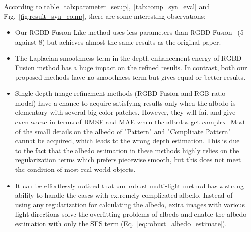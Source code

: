 According to table~\ref{tab:parameter_setup},~\ref{tab:comp_syn_eval} and Fig.~\ref{fig:result_syn_comp}, there are some interesting observations:
\begin{itemize}
    \item Our RGBD-Fusion Like method uses less parameters than RGBD-Fusion~\cite{or2015rgbd} (5 against 8) but achieves almost the same results as the original paper. 
    \item The Laplacian smoothness term in the depth enhancement energy of RGBD-Fusion method has a huge impact on the refined results. In contrast, both our proposed methods have no smoothness term but gives equal or better results.
    \item Single depth image refinement methods (RGBD-Fusion and RGB ratio model) have a chance to acquire satisfying results only when the albedo is elementary with several big color patches. 
    However, they will fail and give even worse in terms of RMSE and MAE when the albedos get complex. 
    Most of the small details on the albedo of "Pattern" and "Complicate Pattern" cannot be acquired, which leads to the wrong depth estimation.
    This is due to the fact that the albedo estimation in these methods highly relies on the regularization terms which prefers piecewise smooth, but this does not meet the condition of most real-world objects.
    \item It can be effortlessly noticed that our robust multi-light method has a strong ability to handle the cases with extremely complicated albedo. 
    Instead of using any regularization for calculating the albedo, extra images with various light directions solve the overfitting problems of albedo and enable the albedo estimation with only the SFS term (Eq.~\ref{eq:robust_albedo_estimate}).
\end{itemize}




